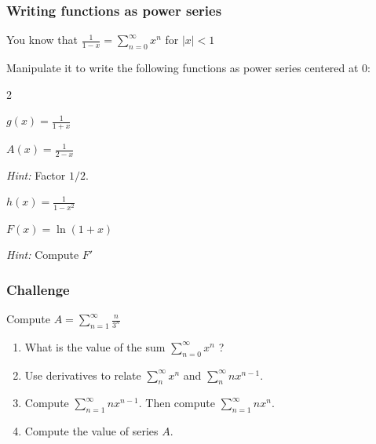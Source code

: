 \begin{frame}[t]
	\frametitle{Writing functions as power series}

	You know that \quad $\displaystyle \frac{1}{1-x}= \sum_{n=0}^{\infty}x^{n}$
	\quad for $|x|<1$

	Manipulate it to write the following functions as power series centered at 0:
	\begin{enumerate}
	\end{enumerate}
\end{frame}

\begin{frame}[t]
	\frametitle{Challenge}

	Compute \quad $\displaystyle A = \sum_{n=1}^{\infty}\frac{n}{3^{n}}$

	\hrulefill

	\begin{enumerate}
		\item What is the value of the sum $\displaystyle \sum_{n=0}^{\infty}x^{n}$ ?

		\item Use derivatives to relate $\displaystyle \sum_{n}^{\infty}x^{n}$ and $\displaystyle
			\sum_{n}^{\infty}nx^{n-1}$.

		\item Compute $\displaystyle \sum_{n=1}^{\infty}n x^{n-1}$. \quad Then
			compute $\displaystyle \sum_{n=1}^{\infty}n x^{n}$.

		\item Compute the value of series $A$.
	\end{enumerate}
\end{frame}

